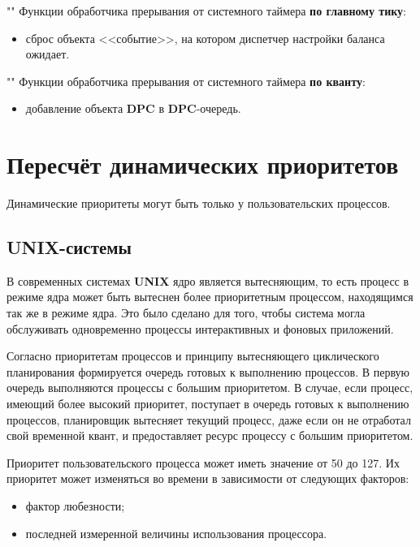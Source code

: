\documentclass[a4paper,12pt]{extreport}
\begin{document}
""\newline
Функции обработчика прерывания от системного таймера \textbf{по главному тику}:
\begin{itemize}
	\item сброс объекта <<событие>>, на котором диспетчер настройки баланса ожидает.
\end{itemize}

""\newline
Функции обработчика прерывания от системного таймера \textbf{по кванту}:
\begin{itemize}
	\item добавление объекта \textbf{DPC} в \textbf{DPC}-очередь.
\end{itemize}
\newpage

\chapter{Пересчёт динамических приоритетов}

Динамические приоритеты могут быть только у пользовательских процессов.

\section{UNIX-системы}

В современных системах \textbf{UNIX} ядро является вытесняющим, то есть процесс в режиме ядра может быть вытеснен более приоритетным процессом, находящимся так же в режиме ядра. Это было сделано для того, чтобы система могла обслуживать одновременно процессы интерактивных и фоновых приложений.

Согласно приоритетам процессов и принципу вытесняющего циклического планирования формируется очередь готовых к выполнению процессов. В первую очередь выполняются процессы с большим приоритетом. В случае, если процесс, имеющий более высокий приоритет, поступает в очередь готовых к выполнению процессов, планировщик вытесняет текущий процесс, даже если он не отработал свой временной квант, и предоставляет ресурс процессу с большим приоритетом.

Приоритет пользовательского процесса может иметь значение от 50 до 127. Их приоритет может изменяться во времени в зависимости от следующих факторов:

\begin{itemize}
	\item фактор любезности;
	\item последней измеренной величины использования процессора.
\end{itemize}
\end{document}
